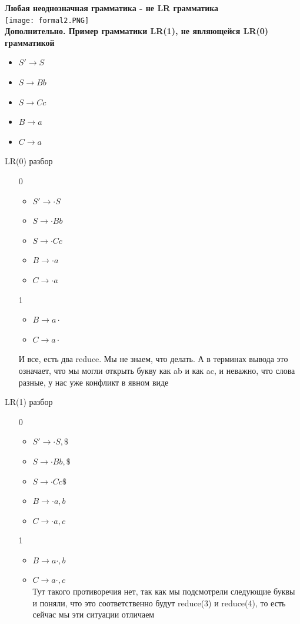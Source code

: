 \textbf{Любая неоднозначная грамматика - не LR грамматика}
\\
\texttt{[image: formal2.PNG]}
\\
\textbf{Дополнительно. Пример грамматики LR(1), не являющейся LR(0) грамматикой}
\begin{itemize}
    \item $S' \rightarrow S$
    \item $S \rightarrow Bb$
    \item $S \rightarrow Cc$
    \item $B \rightarrow a$
     \item $C \rightarrow a$
\end{itemize}
LR(0) разбор
\begin{itemize}
    \item [0] \begin{itemize}
        \item $S' \rightarrow \cdot S$
    \item $S \rightarrow \cdot Bb$
    \item $S \rightarrow \cdot Cc$
    \item $B \rightarrow \cdot a$
     \item $C \rightarrow \cdot a$
    \end{itemize}
    \item [1] \begin{itemize}
        \item $B \rightarrow  a \cdot$
        \item $C \rightarrow a\cdot$
    \end{itemize}
    И все, есть два reduce. Мы не знаем, что делать. А в терминах вывода это означает, что мы могли открыть букву как  ab и как ac, и неважно, что слова разные, у нас уже конфликт в явном виде
\end{itemize}
LR(1) разбор
\begin{itemize}
        \item [0] \begin{itemize}
        \item $S' \rightarrow \cdot S, \$ $
    \item $S \rightarrow \cdot Bb,\$ $
    \item $S \rightarrow \cdot Cc \$$
    \item $B \rightarrow \cdot a, b$
     \item $C \rightarrow \cdot a, c$
    \end{itemize}
    \item [1] \begin{itemize}
        \item $B \rightarrow  a \cdot, b$
        \item $C \rightarrow a\cdot, c$
        \\
        Тут такого противоречия нет, так как мы подсмотрели следующие буквы и поняли, что это соответственно будут reduce(3) и  reduce(4), то есть сейчас мы эти ситуации отличаем
    \end{itemize}
\end{itemize}

